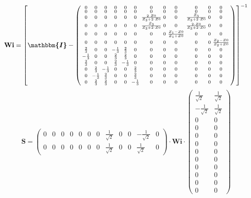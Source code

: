 \[ \mathbf{Wi} =  \left[ \boldsymbol{\mathbbm{I}}  -
\left(\begin{smallmatrix} 0 & 0 & 0 & 0 & 0 & 0 & 0 & 0 & 0 & 0 & 0 &
0 \\ 0 & 0 & 0 & 0 & 0 & 0 & 0 & 0 & 0 & 0 & 0 & 0 \\ 0 & 0 & 0 & 0 &
0 & 0 & \frac{2\cdot Z0}{Z_3+2\cdot Z0} & 0 & 0 &
\frac{Z_3}{Z_3+2\cdot Z0} & 0 & 0 \\ 0 & 0 & 0 & 0 & 0 & 0 &
\frac{Z_3}{Z_3+2\cdot Z0} & 0 & 0 & \frac{2\cdot Z0}{Z_3+2\cdot Z0} &
0 & 0 \\ 0 & 0 & 0 & 0 & 0 & 0 & 0 & 0 & \frac{ Z_1 -Z0}{ Z_1 +Z0} & 0
& 0 & 0 \\ 0 & 0 & 0 & 0 & 0 & 0 & 0 & 0 & 0 & 0 & 0 & \frac{ Z_2
-Z0}{ Z_2 +Z0} \\ \frac{2}{3} & 0 & 0 & -\frac{1}{3} & \frac{2}{3} & 0
& 0 & 0 & 0 & 0 & 0 & 0 \\ -\frac{1}{3} & 0 & 0 & \frac{2}{3} &
\frac{2}{3} & 0 & 0 & 0 & 0 & 0 & 0 & 0 \\ \frac{2}{3} & 0 & 0 &
\frac{2}{3} & -\frac{1}{3} & 0 & 0 & 0 & 0 & 0 & 0 & 0 \\ 0 &
\frac{2}{3} & -\frac{1}{3} & 0 & 0 & \frac{2}{3} & 0 & 0 & 0 & 0 & 0 &
0 \\ 0 & -\frac{1}{3} & \frac{2}{3} & 0 & 0 & \frac{2}{3} & 0 & 0 & 0
& 0 & 0 & 0 \\ 0 & \frac{2}{3} & \frac{2}{3} & 0 & 0 & -\frac{1}{3} &
0 & 0 & 0 & 0 & 0 & 0 \end{smallmatrix}\right) \right]^{-1}  \]
\[ \mathbf{S} = \left(\begin{smallmatrix} 0 & 0 & 0 & 0 & 0 & 0 & 0 &
\frac{1}{\sqrt{2}} & 0 & 0 & -\frac{1}{\sqrt{2}} & 0 \\ 0 & 0 & 0 & 0
& 0 & 0 & 0 & \frac{1}{\sqrt{2}} & 0 & 0 & \frac{1}{\sqrt{2}} & 0
\end{smallmatrix}\right) \cdot \mathbf{Wi}
\cdot\left(\begin{smallmatrix} \frac{1}{\sqrt{2}} & \frac{1}{\sqrt{2}}
\\ -\frac{1}{\sqrt{2}} & \frac{1}{\sqrt{2}} \\ 0 & 0 \\ 0 & 0 \\ 0 & 0
\\ 0 & 0 \\ 0 & 0 \\ 0 & 0 \\ 0 & 0 \\ 0 & 0 \\ 0 & 0 \\ 0 & 0
\end{smallmatrix}\right) \]
